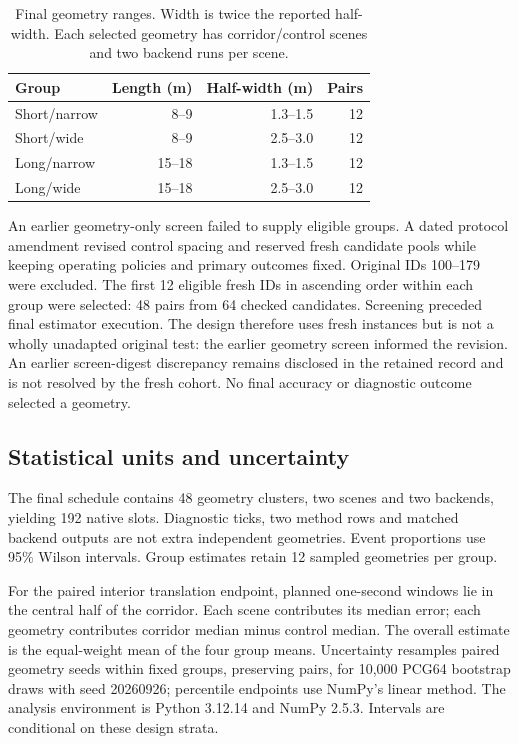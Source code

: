 \documentclass[conference]{IEEEtran}
\begin{document}
\begin{table}[t]
\caption{Final geometry ranges. Width is twice the reported half-width.
Each selected geometry has corridor/control scenes and two backend runs per
scene.}\label{tab:design}
\centering\small
\begin{tabular}{@{}lrrr@{}}
\toprule Group & Length (m) & Half-width (m) & Pairs\\\midrule
Short/narrow & 8--9 & 1.3--1.5 & 12\\
Short/wide & 8--9 & 2.5--3.0 & 12\\
Long/narrow & 15--18 & 1.3--1.5 & 12\\
Long/wide & 15--18 & 2.5--3.0 & 12\\\bottomrule
\end{tabular}
\end{table}

An earlier geometry-only screen failed to supply eligible groups. A dated
protocol amendment revised control spacing and reserved fresh candidate
pools while keeping operating policies and primary outcomes fixed.
Original IDs 100--179 were excluded. The first 12 eligible fresh IDs in
ascending order within each group were selected: 48 pairs from 64 checked
candidates. Screening preceded final estimator execution. The design
therefore uses fresh instances but is not a wholly unadapted original test:
the earlier geometry screen informed the revision. An earlier screen-digest
discrepancy remains disclosed in the retained record and is not resolved by
the fresh cohort. No final accuracy or diagnostic outcome selected a geometry.

\subsection{Statistical units and uncertainty}
The final schedule contains 48 geometry clusters, two scenes and two backends,
yielding 192 native slots. Diagnostic ticks, two method rows and matched
backend outputs are not extra independent geometries. Event proportions use
95\% Wilson intervals. Group estimates retain 12 sampled geometries per group.

For the paired interior translation endpoint, planned one-second windows
lie in the central half of the corridor. Each scene contributes its median
error; each geometry contributes corridor median minus control median.
The overall estimate is the equal-weight mean of the four group means.
Uncertainty resamples paired geometry seeds within fixed groups, preserving
pairs, for 10,000 PCG64 bootstrap draws with seed 20260926; percentile
endpoints use NumPy's linear method. The analysis environment is Python
3.12.14 and NumPy 2.5.3. Intervals are conditional on these design strata.
\end{document}
